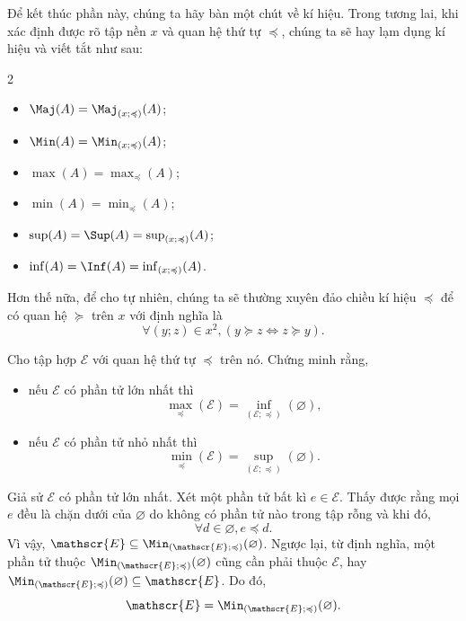 Để kết thúc phần này, chúng ta hãy bàn một chút về kí hiệu. Trong tương lai, khi xác định được rõ tập nền $x$ và quan hệ thứ tự $\preccurlyeq$, chúng ta sẽ hay lạm dụng kí hiệu và viết tắt như sau:
\begin{multicols}{2}
   \begin{itemize}
      \item $\Maj(A) = \Maj_{\left(x; \preccurlyeq\right)}(A)$;
      \item $\Min(A) = \Min_{\left(x; \preccurlyeq\right)}(A)$;
      \item $\max(A) = \max_{\preccurlyeq}(A)$;
      \item $\min(A) = \min_{\preccurlyeq}(A)$;
      \item $\sup(A) = \Sup(A) = \sup_{\left(x; \preccurlyeq\right)}(A)$;
      \item $\inf(A) = \Inf(A) = \inf_{\left(x; \preccurlyeq\right)}(A)$.
   \end{itemize}
\end{multicols}
Hơn thế nữa, để cho tự nhiên, chúng ta sẽ thường xuyên đảo chiều kí hiệu $\preccurlyeq$ để có quan hệ $
\succcurlyeq$ trên $x$ với định nghĩa là
$$\forall (y;z) \in x^2, (y \succcurlyeq z \iff z \succcurlyeq y).$$

\exercise Cho tập hợp $\mathscr{E}$ với quan hệ thứ tự $\preccurlyeq$ trên nó. Chứng minh rằng,
\begin{itemize}
   \item nếu $\mathscr{E}$ có phần tử lớn nhất thì \begin{equation*}
      \max_\preccurlyeq(\mathscr{E}) = \inf_{(\mathscr{E}; \preccurlyeq)}(\varnothing),
   \end{equation*}
   \item nếu $\mathscr{E}$ có phần tử nhỏ nhất thì \begin{equation*}
      \min_\preccurlyeq(\mathscr{E}) = \sup_{(\mathscr{E}; \preccurlyeq)}(\varnothing).
   \end{equation*}
\end{itemize} 

\solution

Giả sử $\mathscr{E}$ có phần tử lớn nhất. Xét một phần tử bất kì $e \in \mathscr{E}$. Thấy được rằng mọi $e$ đều là chặn dưới của $\varnothing$ do không có phần tử nào trong tập rỗng và khi đó,
$$
   \forall d \in \varnothing, e \preccurlyeq d.
$$  
Vì vậy, $\mathscr{E} \subseteq \Min_{(\mathscr{E}; \preccurlyeq)}(\varnothing)$. Ngược lại, từ định nghĩa, một phần tử thuộc $\Min_{(\mathscr{E}; \preccurlyeq)}(\varnothing)$ cũng cần phải thuộc $\mathscr{E}$, hay $\Min_{(\mathscr{E}; \preccurlyeq)}(\varnothing) \subseteq \mathscr{E}$. Do đó, 
\begin{equation*}
   \mathscr{E} = \Min_{(\mathscr{E}; \preccurlyeq)}(\varnothing).
\end{equation*}

